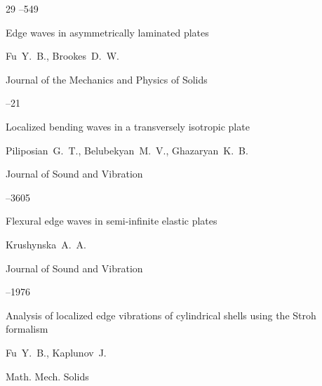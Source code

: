 \begin{thebibliography}{29}
--549






\paper Edge waves in asymmetrically laminated plates

\by Fu~Y.~B., Brookes~D.~W.

\jour Journal of the Mechanics and Physics of Solids




--21





\paper Localized bending waves in a transversely isotropic plate

\by Piliposian~G.~T., Belubekyan~M.~V., Ghazaryan~K.~B.

\jour Journal of Sound and Vibration




–3605





\paper Flexural edge waves in semi-infinite elastic plates

\by Krushynska~A.~A.

\jour Journal of Sound and Vibration




–1976





\paper Analysis of localized edge vibrations of cylindrical shells using the Stroh formalism

\by Fu~Y.~B., Kaplunov~J.

\jour Math. Mech. Solids



\end{thebibliography}
